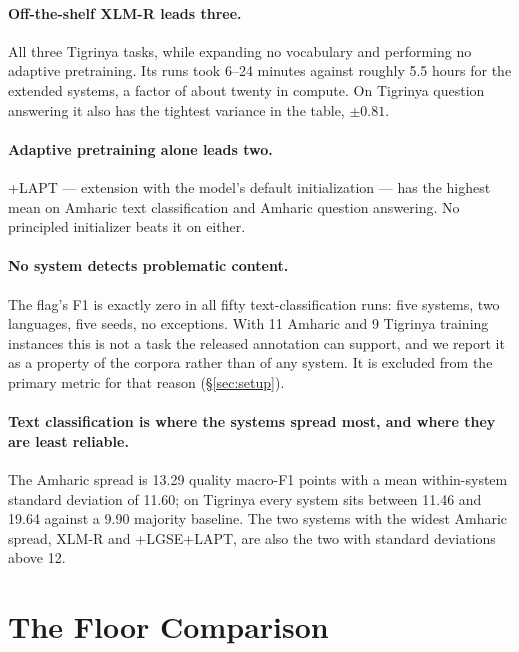 \documentclass[11pt]{article}
\begin{document}
\paragraph{Off-the-shelf XLM-R leads three.} All three Tigrinya tasks, while
expanding no vocabulary and performing no adaptive pretraining. Its runs took
6--24 minutes against roughly 5.5 hours for the extended systems, a factor of
about twenty in compute. On Tigrinya question answering it also has the
tightest variance in the table, $\pm0.81$.

\paragraph{Adaptive pretraining alone leads two.} \textsc{+LAPT} --- extension
with the model's default initialization --- has the highest mean on Amharic
text classification and Amharic question answering. No principled initializer
beats it on either.

\paragraph{No system detects problematic content.} The flag's F1 is exactly
zero in all fifty text-classification runs: five systems, two languages, five
seeds, no exceptions. With 11 Amharic and 9 Tigrinya training instances this
is not a task the released annotation can support, and we report it as a
property of the corpora rather than of any system. It is excluded from the
primary metric for that reason (\S\ref{sec:setup}).

\paragraph{Text classification is where the systems spread most, and where
they are least reliable.} The Amharic spread is 13.29 quality macro-F1 points
with a mean within-system standard deviation of 11.60; on Tigrinya every
system sits
between 11.46 and 19.64 against a 9.90 majority baseline. The two systems
with the widest Amharic spread, XLM-R and \textsc{+LGSE+LAPT}, are also the
two with standard deviations above 12.

\section{The Floor Comparison}
\label{sec:floor}
\end{document}
